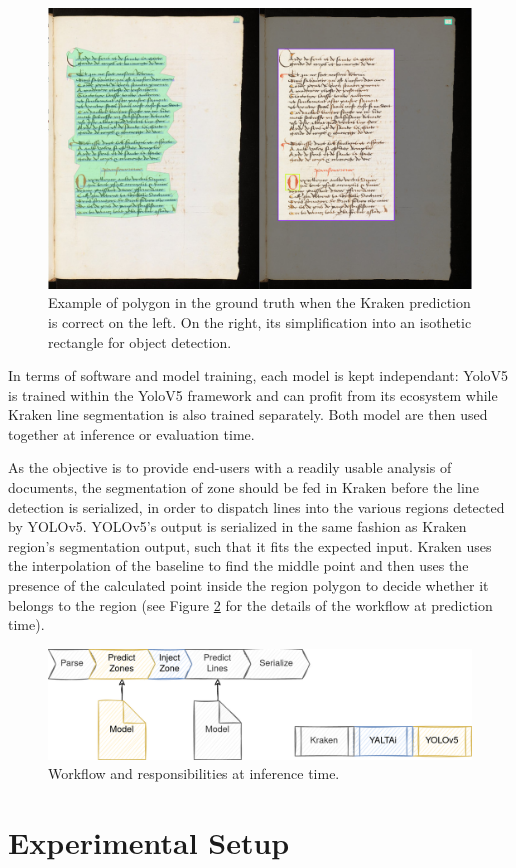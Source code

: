 \documentclass{jdmdh}
\begin{document}
\begin{figure}
    \centering
    \includegraphics[width=.5\linewidth]{images/rectangulisation.jpg}
    \caption{Example of polygon in the ground truth when the Kraken prediction is correct on the left. On the right, its simplification into an isothetic rectangle for object detection.}
    \label{fig:yaltai:rectangulisation}
\end{figure}

In terms of software and model training, each model is kept independant: YoloV5 is trained within the YoloV5 framework and can profit from its ecosystem while Kraken line segmentation is also trained separately. Both model are then used together at inference or evaluation time.

As the objective is to provide end-users with a readily usable analysis of documents, the segmentation of zone should be fed in Kraken before the line detection is serialized, in order to dispatch lines into the various regions detected by YOLOv5. YOLOv5's output is serialized in the same fashion as Kraken region's segmentation output, such that it fits the expected input. Kraken uses the interpolation of the baseline to find the middle point and then uses the presence of the calculated point inside the region polygon to decide whether it belongs to the region (see Figure \ref{fig:yaltai:injection} for the details of the workflow at prediction time).

\begin{figure}
    \centering
    \includegraphics[width=.8\linewidth]{images/yaltaiinjection.png}
    \caption{Workflow and responsibilities at inference time.}
    \label{fig:yaltai:injection}
\end{figure}

\section{Experimental Setup}
\end{document}
